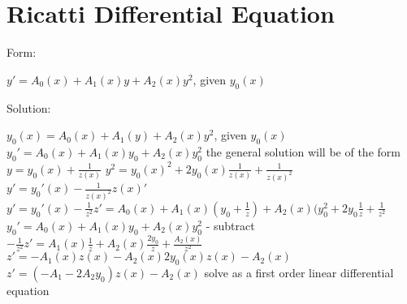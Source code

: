 \documentclass[12 pt, oneside]{book}
\begin{document}
\section{Ricatti Differential Equation}
Form:
\begin{mathline}
$y'=A_0(x)+A_1(x)y+A_2(x)y^2$, given $y_0(x)$
\end{mathline}
Solution:
\begin{mathline}
$y_0(x)=A_0(x)+A_1(y)+A_2(x)y^2$, given $y_0(x)$\newline{}
$y_0'=A_0(x)+A_1(x)y_0+A_2(x)y_0^2$\newline{}
\indent the general solution will be of the form $y=y_0(x)+\frac{1}{z(x)}$\newline{}
\indent $y^2=y_0(x)^2+2y_0(x)\frac{1}{z(x)}+\frac{1}{z(x)^2}$\newline{}
\indent $y'=y_0'(x)-\frac{1}{z(x)^2}z(x)'$\newline{}
\indent $y'=y_0'(x)-\frac{1}{z^2}z'=A_0(x)+A_1(x)(y_0+\frac{1}{z})+A_2(x)(y_0^2+2y_0\frac{1}{z}+\frac{1}{z^2}$\newline{}
\indent $y_0'=A_0(x)+A_1(x)y_0+A_2(x)y_0^2$ - subtract
\indent $-\frac{1}{z^2}z'=A_1(x)\frac{1}{z}+A_2(x)\frac{2y_0}{z}+\frac{A_2(x)}{z^2}$\newline{}
\indent $z'=-A_1(x)z(x)-A_2(x)2y_0(x)z(x)-A_2(x)$\newline{}
\indent $z'=(-A_1-2A_2y_0)z(x)-A_2(x)$\newline{}
solve as a first order linear differential equation
\end{mathline}
\end{document}
